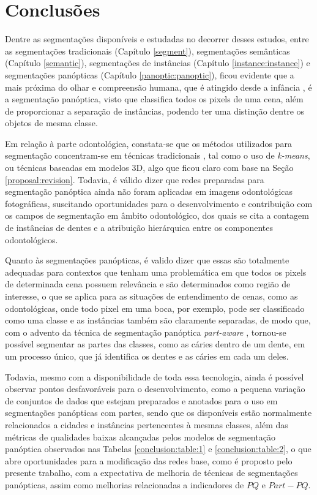 \newpage
\clearpage
\section{Conclusões}
\label{final:final}

Dentre as segmentações disponíveis e estudadas no decorrer desses estudos, entre as segmentações tradicionais (Capítulo \ref{segment}), segmentações semânticas (Capítulo \ref{semantic}), segmentações de instâncias (Capítulo \ref{instance:instance}) e segmentações panópticas (Capítulo \ref{panoptic:panoptic}), ficou evidente que a mais próxima do olhar e compreensão humana, que é atingido desde a infância \cite{Mohan2020}, é a segmentação panóptica, visto que classifica todos os pixels de uma cena, além de proporcionar a separação de instâncias, podendo ter uma distinção dentre os objetos de mesma classe.

Em relação à parte odontológica, constata-se que os métodos utilizados para segmentação concentram-se em técnicas tradicionais \cite{Hammad2020}, tal como o uso de \textit{k-means}, ou técnicas baseadas em modelos 3D, algo que ficou claro com base na Seção \ref{proposal:revision}. Todavia, é válido dizer que redes preparadas para segmentação panóptica ainda não foram aplicadas em imagens odontológicas fotográficas, suscitando oportunidades para o desenvolvimento e contribuição com os campos de segmentação em âmbito odontológico, dos quais se cita a contagem de instâncias de dentes e a atribuição hierárquica entre os componentes odontológicos.

Quanto às segmentações panópticas, é valido dizer que essas são totalmente adequadas para contextos que tenham uma problemática em que todos os pixels de determinada cena possuem relevância e são determinados como região de interesse, o que se aplica para as situações de entendimento de cenas, como as odontológicas, onde todo pixel em uma boca, por exemplo, pode ser classificado como uma classe e as instâncias também são claramente separadas, de modo que, com o advento da técnica de segmentação panóptica \textit{part-aware} \cite{DeGeus2021}, tornou-se possível segmentar as partes das classes, como as cáries dentro de um dente, em um processo único, que já identifica os dentes e as cáries em cada um deles.

Todavia, mesmo com a disponibilidade de toda essa tecnologia, ainda é possível observar pontos desfavoráveis para o desenvolvimento, como a pequena variação de conjuntos de dados que estejam preparados e anotados para o uso em segmentações panópticas com partes, sendo que os disponíveis estão normalmente relacionados a cidades e instâncias pertencentes à mesmas classes, além das métricas de qualidades baixas alcançadas pelos modelos de segmentação panóptica observados nas Tabelas \ref{conclusion:table:1} e \ref{conclusion:table:2}, o que abre oportunidades para a modificação das redes base, como é proposto pelo presente trabalho, com a expectativa de melhoria de técnicas de segmentações panópticas, assim como melhorias relacionadas a indicadores de $PQ$ e $Part-PQ$.

